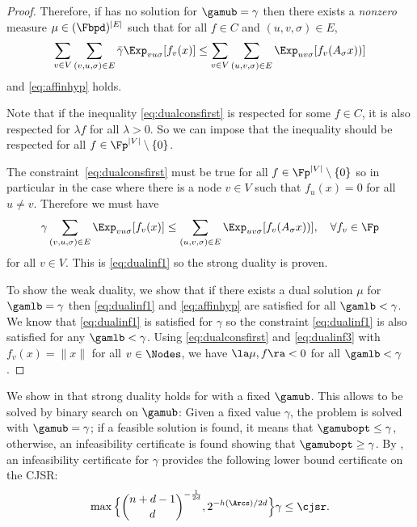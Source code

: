 \documentclass[11pt,twoside,a4paper,openright]{uclouvain-thesis}
\newcommand{\expfrac}[2]{#1/#2}
\begin{document}
\begin{mylem}
\begin{proof}
    Therefore, if  has no solution for $\gamub = \gamma$ then there exists
    a \emph{nonzero} measure $\mu \in (\Fbpd)^{|E|}$ such that for all $f \in C$ and $(u,v,\sigma) \in E$,
    \begin{equation}
      \label{eq:dualconsfirst}
      \sum_{v \in V} \sum_{(v,u,\sigma) \in E} \bar{\gamma} \Exp_{vu\sigma}[f_v(x)] \leq \sum_{v \in V} \sum_{(u,v,\sigma) \in E} \Exp_{uv\sigma}[f_v(A_\sigma x))]
    \end{equation}
    and \eqref{eq:affinhyp} holds.

    Note that if the inequality \eqref{eq:dualconsfirst} is respected for some $f \in C$, it is also respected for $\lambda f$ for all $\lambda > 0$.
    So we can impose that the inequality should be respected for all $f \in \Fp^{|V|} \setminus \{0\}$.

    The constraint~\eqref{eq:dualconsfirst} must be true for all $f \in \Fp^{|V|} \setminus \{0\}$ so in particular in the case where there is a node $v \in V$ such that $f_u(x) = 0$ for all $u \neq v$.
    Therefore we must have
    \[ \gamma \sum_{(v,u,\sigma) \in E} \Exp_{vu\sigma}[f_v(x)] \leq \sum_{(u,v,\sigma) \in E} \Exp_{uv\sigma}[f_v(A_\sigma x))], \quad \forall f_v \in \Fp \]
    for all $v \in V$.
    This is \eqref{eq:dualinf1} so the strong duality is proven.

    To show the weak duality, we show that if there exists a dual solution $\mu$ for $\gamlb=\gamma$ then \eqref{eq:dualinf1} and \eqref{eq:affinhyp} are satisfied for all $\gamlb < \gamma$.
    We know that \eqref{eq:dualinf1} is satisfied for $\gamma$ so the constraint \eqref{eq:dualinf1} is also satisfied for any $\gamlb < \gamma$.
    Using \eqref{eq:dualconsfirst} and \eqref{eq:dualinf3} with $f_v(x) = \|x\|$ for all $v \in \Nodes$,
    we have $\la \mu, f \ra < 0$ for all $\gamlb < \gamma$.


  \end{proof}
\end{mylem}



We show in  that strong duality holds for  with a fixed $\gamub$.
This allows  to be solved by binary search on $\gamub$:
Given a fixed value $\gamma$, the problem is solved with $\gamub = \gamma$;
if a feasible solution is found, it means that $\gamubopt \leq \gamma$,
otherwise, an infeasibility certificate
is found showing that $\gamubopt \geq \gamma$.
By , an infeasibility certificate for $\gamma$ provides the following
lower bound certificate on the CJSR:
\[
  \max\Big\{{n+d-1 \choose d}^{-\frac{1}{2d}}, 2^{-\expfrac{h(\Arcs)}{2d}}\Big\} \gamma
  \leq \cjsr.
\]
\end{document}
